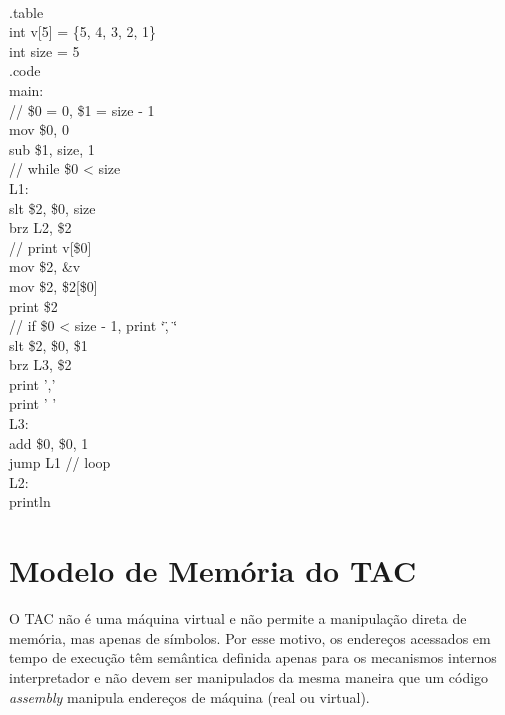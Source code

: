 \documentclass[12pt,a4paper,extrafontsizes,article]{memoir}
\newcommand*{\srcfont}{\fontfamily{pcr}\selectfont}
\begin{document}
{\srcfont
{}\\
{\color{gray}.table}\\
{\color{blue}int} v[5] = \{{\color{orange}5}, {\color{orange}4}, {\color{orange}3}, {\color{orange}2},
{\color{orange}1}\}\\
{\color{blue}int} size = {\color{orange}5}\\
{\color{gray}.code}\\
{\color{red}main:}\\
{\color{green!50!black}// \$0 = 0, \$1 = size - 1}\\
{\color{violet}mov} \$0, {\color{orange}0}\\
{\color{violet}sub} \$1, size, {\color{orange}1}\\
{\color{green!50!black}// while \$0 < size}\\
{\color{red}L1:}\\
{\color{violet}slt} \$2, \$0, size\\
{\color{violet}brz} L2, \$2\\
{\color{green!50!black}// print v[\$0]}\\
{\color{violet}mov} \$2, \&v\\
{\color{violet}mov} \$2, \$2[\$0]\\
{\color{violet}print} \$2\\
{\color{green!50!black}// if \$0 < size - 1, print \char`\", \char`\"}\\
{\color{violet}slt} \$2, \$0, \$1\\
{\color{violet}brz} L3, \$2\\
{\color{violet}print} {\color{orange}','}\\
{\color{violet}print} {\color{orange}' '}\\
{\color{red}L3:}\\
{\color{violet}add} \$0, \$0, {\color{orange}1}\\
{\color{violet}jump} L1 {\color{green!50!black}// loop}\\
{\color{red}L2:}\\
{\color{violet}println}\\
}


\clearpage
\chapter{Modelo de Memória do TAC}
\label{chp:memory}

O TAC não é uma máquina virtual e não permite a manipulação direta de memória, mas apenas de símbolos. Por esse motivo,
os endereços acessados em tempo de execução têm semântica definida apenas para os mecanismos internos interpretador e
não devem ser manipulados da mesma maneira que um código \textit{assembly} manipula endereços de máquina (real ou
virtual).
\end{document}
